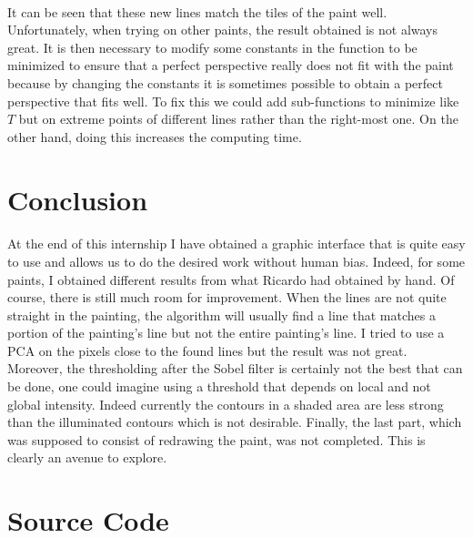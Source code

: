 \documentclass[11pt]{article}
\begin{document}
	\paragraph{}
	It can be seen that these new lines match the tiles of the paint well. Unfortunately, when trying on other paints, the result obtained is not always great. It is then necessary to modify some constants in the function to be minimized to ensure that a perfect perspective really does not fit with the paint because by changing the constants it is sometimes possible to obtain a perfect perspective that fits well. To fix this we could add sub-functions to minimize like $T$ but on extreme points of different lines rather than the right-most one. On the other hand, doing this increases the computing time.

	\section{Conclusion}
	
	\paragraph{}
	At the end of this internship I have obtained a graphic interface that is quite easy to use and allows us to do the desired work without human bias. Indeed, for some paints, I obtained different results from what Ricardo had obtained by hand. Of course, there is still much room for improvement. When the lines are not quite straight in the painting, the algorithm will usually find a line that matches a portion of the painting's line but not the entire painting's line. I tried to use a PCA on the pixels close to the found lines but the result was not great. Moreover, the thresholding after the Sobel filter is certainly not the best that can be done, one could imagine using a threshold that depends on local and not global intensity. Indeed currently the contours in a shaded area are less strong than the illuminated contours which is not desirable. Finally, the last part, which was supposed to consist of redrawing the paint, was not completed. This is clearly an avenue to explore.
	
	\appendix
	
	
	
	
	\section{Source Code}
	
\end{document}

